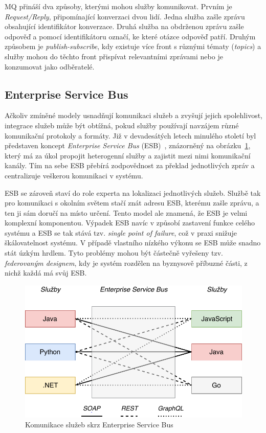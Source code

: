 MQ přináší dva způsoby, kterými mohou služby komunikovat. Prvním je
\textit{Request/Reply}, připomínající konverzaci dvou lidí. Jedna
služba zašle zprávu obsahující identifikátor konverzace. Druhá služba
na obdrženou zprávu zašle odpověď a pomocí identifikátoru označí,
ke které otázce odpověď patří. Druhým způsobem je \textit{publish-subscribe},
kdy existuje více front s různými tématy (\textit{topics}) a služby mohou
do těchto front přispívat relevantními zprávami nebo je konzumovat jako odběratelé.

\subsection{Enterprise Service Bus}

Ačkoliv zmíněné modely usnadňují komunikaci služeb a zvyšují jejich
spolehlivost, integrace služeb může být obtížná, pokud služby používají navzájem různé
komunikační protokoly a formáty. Již v devadesátých letech minulého století
byl představen koncept \textit{Enterprise Service
Bus} (ESB)~\cite{chappell2004enterprise},
znázorněný na obrázku~\ref{fig:enterprise-service-bus},
který má za úkol propojit heterogenní služby a zajistit mezi nimi
komunikační kanály. Tím na sebe ESB přebírá zodpovědnost za překlad
jednotlivých zpráv a centralizuje veškerou komunikaci v systému.

ESB se zároveň staví do role experta na lokalizaci jednotlivých služeb.
Službě tak pro komunikaci s okolním světem stačí znát adresu ESB, kterému
zašle zprávu, a ten ji sám doručí na místo určení. Tento model ale
znamená, že ESB je velmi komplexní komponentou. Výpadek ESB navíc
v způsobí zastavení funkce celého systému a ESB se tak stává
tzv. \textit{single point of failure}, což v praxi snižuje škálovatelnost systému.
V případě vlastního nízkého výkonu se ESB může snadno stát úzkým hrdlem.
Tyto problémy mohou být částečně vyřešeny tzv. \textit{federovaným designem},
kdy je systém rozdělen na byznysově příbuzné části, z nichž každá má
svůj ESB.

\begin{figure}
    \centering
    \includegraphics[keepaspectratio=true, width=0.7\linewidth]{figures/enterprise-service-bus.pdf}
    \caption{Komunikace služeb skrz Enterprise Service Bus}
    \label{fig:enterprise-service-bus}
\end{figure}

